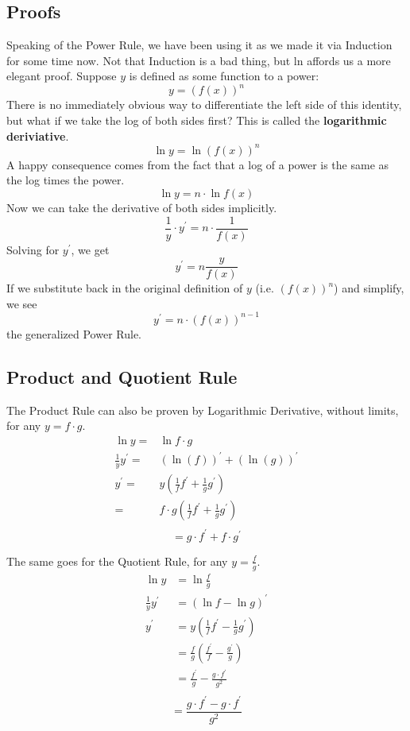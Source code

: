 \subsection{Proofs}
Speaking of the Power Rule, we have been using it as we made it via Induction for 
some time now.  Not that Induction is a bad thing, but ln affords us a more elegant 
proof.  Suppose $y$ is defined as some function to a power:
$$
y = \left(f(x)\right)^n
$$
There is no immediately obvious way to differentiate the left side of this identity, but
what if we take the log of both sides first?  This is called the \textbf{logarithmic deriviative}.
$$
\ln{y} = \ln{\left(f(x)\right)^n}
$$
A happy consequence comes from the fact that a log of a power is the same as the
log times the power.
$$
\ln{y} = n\cdot\ln{f(x)}
$$
Now we can take the derivative of both sides implicitly.
$$
\frac{1}{y} \cdot y^\prime = n \cdot \frac{1}{f(x)}
$$
Solving for $y^\prime$, we get
$$
y^\prime = n \frac{y}{f(x)}
$$
If we substitute back in the original definition of $y$ (i.e. $\left(f(x)\right)^n$) and simplify,
we see
\begin{equation}
y^\prime = n\cdot{}\left(f(x)\right)^{n-1}
\end{equation}
the generalized Power Rule.


\subsection{Product and Quotient Rule}
The Product Rule can also be proven by Logarithmic Derivative, without limits, for any 
$y = f\cdot{}g$.
\begin{align*}
\ln{y}  = & \ln{f \cdot{} g}  \\
\frac{1}{y}y^\prime =& \left(\ln(f)\right)^\prime + \left(\ln(g)\right)^\prime \\
y^\prime =& y(\frac{1}{f}f^\prime + \frac{1}{g}g^\prime)  \\
 =& f\cdot{}g(\frac{1}{f}f^\prime + \frac{1}{g}g^\prime)  \\
\end{align*}
\begin{equation}
  =  g\cdot{}f^\prime + f\cdot{}g^\prime
\end{equation}

The same goes for the Quotient Rule, for any $y=\frac{f}{g}$.
\begin{align*}
\ln{y} &= \ln{\frac{f}{g}} \\
\frac{1}{y}y^\prime &= \left(\ln{f} - \ln{g}\right)^\prime \\
y^\prime &= y\left(\frac{1}{f}f^\prime - \frac{1}{g}g^\prime\right) \\
  &= \frac{f}{g}\left(\frac{f^\prime}{f} - \frac{g^\prime}{g}\right) \\
  &= \frac{f^\prime}{g} - \frac{g\cdot{}f^\prime}{g^2}\\
\end{align*}
\begin{equation}
  = \frac{g\cdot{}f^\prime - g\cdot{}f^\prime}{g^2}
\end{equation}

